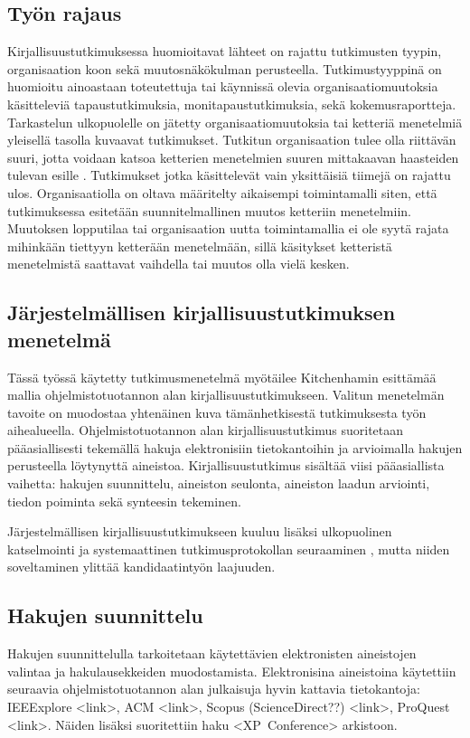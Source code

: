 \subsection{Työn rajaus}
Kirjallisuustutkimuksessa huomioitavat lähteet on rajattu tutkimusten tyypin,
organisaation koon sekä muutosnäkökulman perusteella. Tutkimustyyppinä on
huomioitu ainoastaan toteutettuja tai käynnissä olevia organisaatiomuutoksia
käsitteleviä tapaustutkimuksia, monitapaustutkimuksia, sekä kokemusraportteja.
Tarkastelun ulkopuolelle on jätetty organisaatiomuutoksia tai ketteriä
menetelmiä yleisellä tasolla kuvaavat tutkimukset. Tutkitun organisaation tulee
olla riittävän suuri, jotta voidaan katsoa ketterien menetelmien suuren
mittakaavan haasteiden tulevan esille . Tutkimukset jotka
käsittelevät vain yksittäisiä tiimejä on rajattu ulos. Organisaatiolla on oltava
määritelty aikaisempi toimintamalli siten, että tutkimuksessa esitetään
suunnitelmallinen muutos ketteriin menetelmiin. Muutoksen lopputilaa tai
organisaation uutta toimintamallia ei ole syytä rajata mihinkään tiettyyn
ketterään menetelmään, sillä käsitykset ketteristä menetelmistä saattavat
vaihdella tai muutos olla vielä kesken.

\subsection{Järjestelmällisen kirjallisuustutkimuksen menetelmä}

Tässä työssä käytetty tutkimusmenetelmä myötäilee Kitchenhamin esittämää mallia
ohjelmistotuotannon alan kirjallisuustutkimukseen. Valitun menetelmän tavoite on
muodostaa yhtenäinen kuva tämänhetkisestä tutkimuksesta työn aihealueella.
Ohjelmistotuotannon alan kirjallisuustutkimus suoritetaan pääasiallisesti
tekemällä hakuja elektronisiin tietokantoihin ja arvioimalla hakujen perusteella
löytynyttä aineistoa. Kirjallisuustutkimus sisältää viisi pääasiallista
vaihetta: hakujen suunnittelu, aineiston seulonta, aineiston laadun arviointi,
tiedon poiminta sekä synteesin tekeminen. 

Järjestelmällisen kirjallisuustutkimukseen kuuluu lisäksi ulkopuolinen
katselmointi ja systemaattinen tutkimusprotokollan seuraaminen
, mutta niiden soveltaminen ylittää kandidaatintyön
laajuuden.

\subsection{Hakujen suunnittelu}
Hakujen suunnittelulla tarkoitetaan käytettävien elektronisten aineistojen
valintaa ja hakulausekkeiden muodostamista. Elektronisina aineistoina käytettiin
seuraavia ohjelmistotuotannon alan julkaisuja hyvin kattavia tietokantoja:
IEEExplore <link>, ACM <link>, Scopus (ScienceDirect??) <link>, ProQuest <link>.
Näiden lisäksi suoritettiin haku <XP~Conference> arkistoon.

